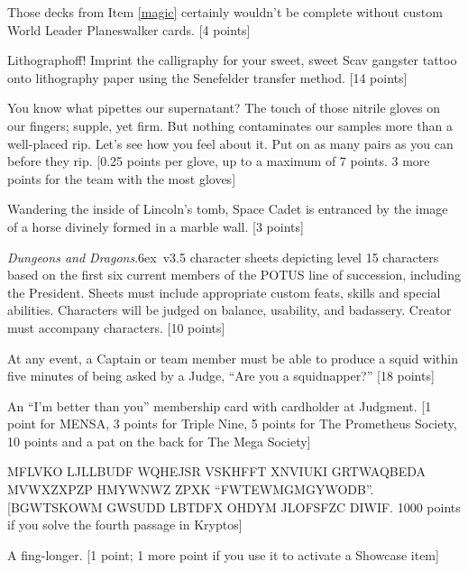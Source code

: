 \documentclass{book}
\def\tr{\raise.6ex\hbox{\scriptsize \textregistered}}
\begin{document}
\begin{list}{}{}
\item Those decks from Item \ref{magic} certainly wouldn't be complete without custom World Leader Planeswalker cards. [4 points]

\item Lithographoff!  Imprint the calligraphy for your sweet, sweet Scav gangster tattoo onto lithography paper using the Senefelder transfer method. [14 points]

\item You know what pipettes our supernatant?  The touch of those nitrile gloves on our fingers; supple, yet firm.  But nothing contaminates our samples more than a well-placed rip.  Let's see how you feel about it. Put on as many pairs as you can before they rip. [0.25 points per glove, up to a maximum of 7 points. 3 more points for the team with the most gloves]

\item Wandering the inside of Lincoln's tomb, Space Cadet is entranced by the image of a horse divinely formed in a marble wall. [3 points]  

\item \emph{Dungeons and Dragons}\tr\ v3.5 character sheets depicting level 15 characters based on the first six current members of the  POTUS line of succession, including the President.  Sheets must include appropriate custom feats, skills and special abilities.  Characters will be judged on balance, usability, and badassery.  Creator must accompany characters. [10 points]

\item At any event, a Captain or team member must be able to produce a squid within five minutes of being asked by a Judge, ``Are you a squidnapper?'' [18 points]

\item An ``I'm better than you'' membership card with cardholder at Judgment. [1 point for MENSA, 3 points for Triple Nine, 5 points for The Prometheus Society, 10 points and a pat on the back for The Mega Society]

\item MFLVKO LJLLBUDF WQHEJSR VSKHFFT XNVIUKI GRTWAQBEDA MVWXZXPZP HMYWNWZ ZPXK ``FWTEWMGMGYWODB''. [BGWTSKOWM GWSUDD LBTDFX OHDYM JLOFSFZC DIWIF. 1000 points if you solve the fourth passage in Kryptos] 

\item A fing-longer.  [1 point; 1 more point if you use it to activate a Showcase item] 

\newpage


\end{list}
\end{document}
